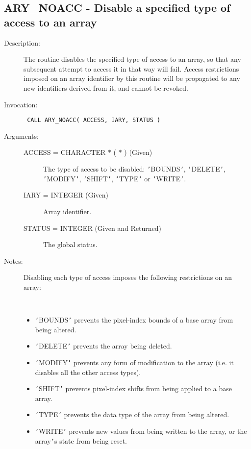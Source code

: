 \documentclass[twoside,11pt]{article}
\newcommand{\xlabel}[1]{}
\newlength{\sstbannerlength}
\newlength{\sstcaptionlength}
\newlength{\sstexampleslength}
\newlength{\sstexampleswidth}
\newcommand{\sstroutine}[3]{
   \goodbreak
   \rule{\textwidth}{0.5mm}
   \vspace{-7ex}
   \newline
   \settowidth{\sstbannerlength}{{\Large {\bf #1}}}
   \setlength{\sstcaptionlength}{\textwidth}
   \setlength{\sstexampleslength}{\textwidth}
   \addtolength{\sstbannerlength}{0.5em}
   \addtolength{\sstcaptionlength}{-2.0\sstbannerlength}
   \addtolength{\sstcaptionlength}{-5.0pt}
   \settowidth{\sstexampleswidth}{{\bf Examples:}}
   \addtolength{\sstexampleslength}{-\sstexampleswidth}
   \parbox[t]{\sstbannerlength}{\flushleft{\Large {\bf #1}}}
   \parbox[t]{\sstcaptionlength}{\center{\Large #2}}
   \parbox[t]{\sstbannerlength}{\flushright{\Large {\bf #1}}}
   \begin{description}
      #3
   \end{description}
}
\newcommand{\sstdescription}[1]{\item[Description:] #1}
\newcommand{\sstinvocation}[1]{\item[Invocation:]\hspace{0.4em}{\tt #1}}
\newcommand{\sstarguments}[1]{
   \item[Arguments:] \mbox{} \\
   \vspace{-3.5ex}
   \begin{description}
      #1
   \end{description}
}
\newcommand{\sstsubsection}[1]{ \item[{#1}] \mbox{} \\}
\newcommand{\sstnotes}[1]{\item[Notes:] \mbox{} \\[1.3ex] #1}
\newcommand{\sstitemlist}[1]{
  \mbox{} \\
  \vspace{-3.5ex}
  \begin{itemize}
     #1
  \end{itemize}
}
\newcommand{\sstitem}{\item}
\newcommand{\ssttt}{\tt}
\renewcommand{\sstroutine}[3]{
      \subsection{#1\xlabel{#1}-\label{#1}#2}
      \begin{description}
         #3
      \end{description}
   }
\renewcommand{\sstdescription}[1]{\item[Description:]
      \begin{description}
         #1
      \end{description}
   }
\renewcommand{\sstinvocation}[1]{\item[Invocation:]
      \begin{description}
         {\ssttt #1}
      \end{description}
   }
\renewcommand{\sstarguments}[1]{
      \item[Arguments:]
      \begin{description}
         #1
      \end{description}
   }
\renewcommand{\sstsubsection}[1]{\item[{#1}]}
\renewcommand{\sstnotes}[1]{\item[Notes:]
      \begin{description}
         #1
      \end{description}
   }
\newcommand{\sstitemlist}[1]{
      \begin{itemize}
         #1
      \end{itemize}
   }
\begin{document}
\sstroutine{
   ARY\_NOACC
}{
   Disable a specified type of access to an array
}{
   \sstdescription{
      The routine disables the specified type of access to an array, so
      that any subsequent attempt to access it in that way will fail.
      Access restrictions imposed on an array identifier by this
      routine will be propagated to any new identifiers derived from
      it, and cannot be revoked.
   }
   \sstinvocation{
      CALL ARY\_NOACC( ACCESS, IARY, STATUS )
   }
   \sstarguments{
      \sstsubsection{
         ACCESS = CHARACTER $*$ ( $*$ ) (Given)
      }{
         The type of access to be disabled: {\tt '}BOUNDS{\tt '}, {\tt '}DELETE{\tt '},
         {\tt '}MODIFY{\tt '}, {\tt '}SHIFT{\tt '}, {\tt '}TYPE{\tt '} or {\tt '}WRITE{\tt '}.
      }
      \sstsubsection{
         IARY = INTEGER (Given)
      }{
         Array identifier.
      }
      \sstsubsection{
         STATUS = INTEGER (Given and Returned)
      }{
         The global status.
      }
   }
   \sstnotes{
      Disabling each type of access imposes the following restrictions
      on an array:
      \sstitemlist{

         \sstitem
         {\tt '}BOUNDS{\tt '} prevents the pixel-index bounds of a base array from
         being altered.

         \sstitem
         {\tt '}DELETE{\tt '} prevents the array being deleted.

         \sstitem
         {\tt '}MODIFY{\tt '} prevents any form of modification to the array (i.e.
         it disables all the other access types).

         \sstitem
         {\tt '}SHIFT{\tt '} prevents pixel-index shifts from being applied to a
         base array.

         \sstitem
         {\tt '}TYPE{\tt '} prevents the data type of the array from being altered.

         \sstitem
         {\tt '}WRITE{\tt '} prevents new values from being written to the array,
         or the array{\tt '}s state from being reset.
      }
   }
}
\end{document}

